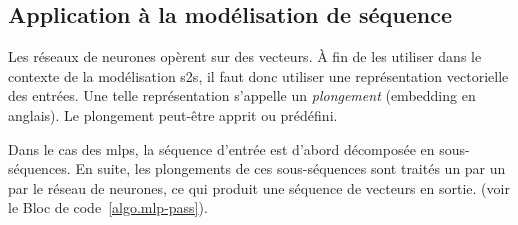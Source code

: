 \subsection{Application à la modélisation de séquence}

Les réseaux de neurones opèrent sur des vecteurs.
À fin de les utiliser dans le contexte de la modélisation \gls{s2s}, 
il faut donc utiliser une représentation vectorielle des entrées.
Une telle représentation s'appelle un \emph{plongement} (\foreignlanguage{english}{embedding} en anglais).
Le plongement peut-être apprit ou prédéfini.

Dans le cas des \glspl{mlp}, la séquence d'entrée est d'abord décomposée en sous-séquences.
En suite, les plongements de ces sous-séquences sont traités un par un par le réseau de neurones,
ce qui produit une séquence de vecteurs en sortie.
(voir le Bloc de code~\ref{algo.mlp-pass}).



